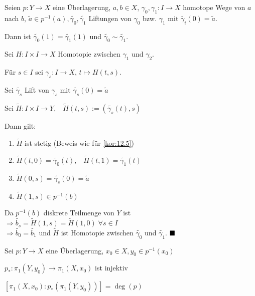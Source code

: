 \begin{proposition}\label{proposition:12.7}%
    Seien $p: Y \rightarrow X$ eine Überlagerung, $a,b \in X$,
    $\gamma_0, \gamma_1: I \rightarrow X$ homotope Wege von $a$ nach
    $b$, $\tilde{a} \in p^{-1}(a), \tilde{\gamma_0}, \tilde{\gamma_1}$
    Liftungen von $\gamma_0$ bzw. $\gamma_1$ mit 
    $\tilde{\gamma_i}(0) = \tilde{a}$.

    Dann ist $\tilde{\gamma_0}(1) = \tilde{\gamma_1}(1)$ und
    $\tilde{\gamma_0} \sim \tilde{\gamma_1}$.
\end{proposition}

\begin{beweis}
    Sei $H: I \times I \rightarrow X$ Homotopie zwischen $\gamma_1$
    und $\gamma_2$.

    Für $s \in I$ sei $\gamma_s: I \rightarrow X$, $t \mapsto H(t,s)$.

    Sei $\tilde{\gamma_s}$ Lift von $\gamma_s$ mit $\tilde{\gamma_s}(0) = \tilde{a}$

    Sei $\tilde{H}: I \times I \rightarrow Y,\;\;\; \tilde{H}(t,s) := (\tilde{\gamma_s}(t), s)$

    Dann gilt:
    \begin{enumerate}[label=(\roman*)]
        \item $\tilde{H}$ ist stetig (Beweis wie für \cref{kor:12.5})
        \item $\tilde{H}(t,0) = \tilde{\gamma_0}(t), \;\;\; \tilde{H}(t,1) = \tilde{\gamma_1}(t)$
        \item $\tilde{H}(0,s) = \tilde{\gamma_s}(0) = \tilde{a}$
        \item $\tilde{H}(1,s) \in p^{-1}(b)$
    \end{enumerate}

    Da $p^{-1}(b)$ diskrete Teilmenge von $Y$ ist\\
    $\Rightarrow \tilde{b_s} = \tilde{H}(1,s) = \tilde{H}(1,0) \;\forall s \in I$\\
    $\Rightarrow \tilde{b_0} = \tilde{b_1}$ und $\tilde{H}$ ist Homotopie 
    zwischen $\tilde{\gamma_0}$ und $\tilde{\gamma_1}$. $\qed$
\end{beweis}

\begin{folgerung}%
    Sei $p: Y \rightarrow X$ eine Überlagerung, $x_0 \in X, y_0 \in p^{-1}(x_0)$
    \begin{bemenum}
        \item \label{folg:12.8a} $p_*: \pi_1(Y, y_0) \rightarrow \pi_1(X, x_0)$ ist injektiv\label{kor:12.8a}
        \item \label{folg:12.8b} $[\pi_1(X, x_0): p_* (\pi_1(Y, y_0))] = \deg(p)$\label{kor:12.8b}
    \end{bemenum}
\end{folgerung}

